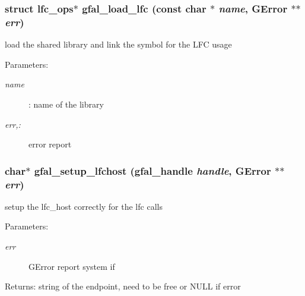 \subsubsection{\setlength{\rightskip}{0pt plus 5cm}struct lfc\_\-ops$\ast$ gfal\_\-load\_\-lfc (const char $\ast$ {\em name}, GError $\ast$$\ast$ {\em err})}\label{lfc__ifce__ng_8c_7c91643749a2c5d7e8043c0e42d00fd6}


load the shared library and link the symbol for the LFC usage \begin{Desc}
\item[Parameters:]
\begin{description}
\item[{\em name}]: name of the library \item[{\em err,:}]error report \end{description}
\end{Desc}
\subsubsection{\setlength{\rightskip}{0pt plus 5cm}char$\ast$ gfal\_\-setup\_\-lfchost (gfal\_\-handle {\em handle}, GError $\ast$$\ast$ {\em err})}\label{lfc__ifce__ng_8c_5d13dc09e91f66d74de768c2e4bf4872}


setup the lfc\_\-host correctly for the lfc calls \begin{Desc}
\item[Parameters:]
\begin{description}
\item[{\em err}]GError report system if \end{description}
\end{Desc}
\begin{Desc}
\item[Returns:]string of the endpoint, need to be free or NULL if error \end{Desc}
